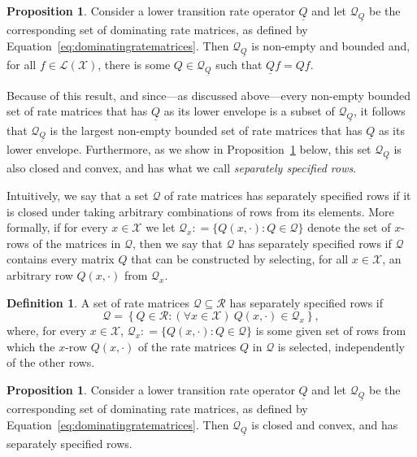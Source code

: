 \documentclass[10pt,a4paper]{paper}
\theoremstyle{definition}
\newtheorem{proposition}[theorem]{Proposition}
\newtheorem{definition}{Definition}
\newcommand{\states}{\mathcal{X}}
\newcommand{\gambles}{\mathcal{L}}
\newcommand{\gamblesX}{\gambles(\states)}
\newcommand{\rateset}{\mathcal{Q}}
\newcommand{\lrate}{\underline{Q}}
\newcommand{\coloneqq}{:\!=}
\begin{document}
\begin{proposition}\label{prop:dominating_nonempty_bounded}
Consider a lower transition rate operator $\lrate$ and let $\rateset_{\lrate}$ be the corresponding set of dominating rate matrices, as defined by Equation~\eqref{eq:dominatingratematrices}. Then $\rateset_{\lrate}$ is non-empty and bounded and, for all $f\in\gamblesX$, there is some $Q\in\rateset_{\lrate}$ such that $\lrate f=Qf$.
\end{proposition}

\noindent
Because of this result, and since---as discussed above---every non-empty bounded set of rate matrices that has $\lrate$ as its lower envelope is a subset of $\rateset_{\lrate}$, it follows that $\rateset_{\lrate}$ is the largest non-empty bounded set of rate matrices that has $\lrate$ as its lower envelope.
Furthermore, as we show in Proposition~\ref{prop:dominatingproperties} below, this set $\rateset_{\lrate}$ is also closed and convex, and has what we call \emph{separately specified rows}. 

Intuitively, we say that a set $\rateset$ of rate matrices has separately specified rows if it is closed under taking arbitrary combinations of rows from its elements. More formally, if for every $x\in\states$ we let $\rateset_x\coloneqq\{Q(x,\cdot):Q\in\rateset\}$ denote the set of $x$-rows of the matrices in $\rateset$, then we say that $\rateset$ has separately specified rows if $\rateset$ contains every matrix $Q$ that can be constructed by selecting, for all $x\in\states$, an arbitrary row $Q(x,\cdot)$ from $\rateset_x$.

\begin{definition}\label{def:separatelyspecifiedrows}
A set of rate matrices $\rateset\subseteq\mathcal{R}$ has separately specified rows if
\begin{equation*}
\rateset=\left\{
Q\in\mathcal{R}
\colon
(\forall x\in\states)~Q(x,\cdot)\in\rateset_x\right\},
\end{equation*}
where, for every $x\in\states$, $\rateset_x\coloneqq\{Q(x,\cdot)\colon Q\in\rateset\}$ is some given set of rows from which the $x$-row $Q(x,\cdot)$ of the rate matrices $Q$ in $\rateset$ is selected, independently of the other rows.
\end{definition}

\begin{proposition}\label{prop:dominatingproperties}
Consider a lower transition rate operator $\lrate$ and let $\rateset_{\lrate}$ be the corresponding set of dominating rate matrices, as defined by Equation~\eqref{eq:dominatingratematrices}. Then $\rateset_{\lrate}$ is closed and convex, and has separately specified rows.
\end{proposition}
\end{document}
